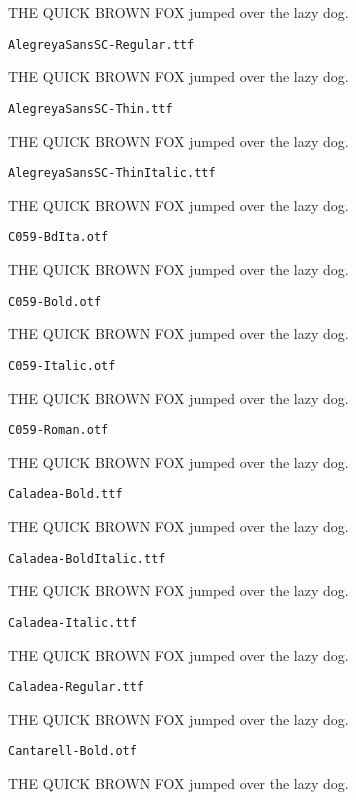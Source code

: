 \documentclass{article}
\begin{document}
THE QUICK BROWN FOX jumped over the lazy dog.

\setmainfont[Extension=.ttf]{AlegreyaSansSC-Regular}
\noindent \verb!AlegreyaSansSC-Regular.ttf!

THE QUICK BROWN FOX jumped over the lazy dog.

\setmainfont[Extension=.ttf]{AlegreyaSansSC-Thin}
\noindent \verb!AlegreyaSansSC-Thin.ttf!

THE QUICK BROWN FOX jumped over the lazy dog.

\setmainfont[Extension=.ttf]{AlegreyaSansSC-ThinItalic}
\noindent \verb!AlegreyaSansSC-ThinItalic.ttf!

THE QUICK BROWN FOX jumped over the lazy dog.

\setmainfont[Extension=.otf]{C059-BdIta}
\noindent \verb!C059-BdIta.otf!

THE QUICK BROWN FOX jumped over the lazy dog.

\setmainfont[Extension=.otf]{C059-Bold}
\noindent \verb!C059-Bold.otf!

THE QUICK BROWN FOX jumped over the lazy dog.

\setmainfont[Extension=.otf]{C059-Italic}
\noindent \verb!C059-Italic.otf!

THE QUICK BROWN FOX jumped over the lazy dog.

\setmainfont[Extension=.otf]{C059-Roman}
\noindent \verb!C059-Roman.otf!

THE QUICK BROWN FOX jumped over the lazy dog.

\setmainfont[Extension=.ttf]{Caladea-Bold}
\noindent \verb!Caladea-Bold.ttf!

THE QUICK BROWN FOX jumped over the lazy dog.

\setmainfont[Extension=.ttf]{Caladea-BoldItalic}
\noindent \verb!Caladea-BoldItalic.ttf!

THE QUICK BROWN FOX jumped over the lazy dog.

\setmainfont[Extension=.ttf]{Caladea-Italic}
\noindent \verb!Caladea-Italic.ttf!

THE QUICK BROWN FOX jumped over the lazy dog.

\setmainfont[Extension=.ttf]{Caladea-Regular}
\noindent \verb!Caladea-Regular.ttf!

THE QUICK BROWN FOX jumped over the lazy dog.

\setmainfont[Extension=.otf]{Cantarell-Bold}
\noindent \verb!Cantarell-Bold.otf!

THE QUICK BROWN FOX jumped over the lazy dog.
\end{document}
